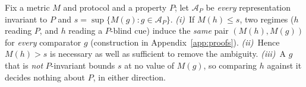 \begin{theorem}
\label{thm:necessity}
Fix a metric $M$ and protocol and a property $P$; let $\mathcal{A}_P$ be \emph{every} representation invariant to $P$ and $s=\sup\{M(g):g\in\mathcal{A}_P\}$. \emph{(i)}~If $M(h)\leq s$, two regimes ($h$ reading $P$, and $h$ reading a $P$-blind cue) induce the \emph{same} pair $(M(h),M(g))$ for \emph{every} comparator $g$ (construction in Appendix~\ref{app:proofs}). \emph{(ii)}~Hence $M(h)>s$ is necessary as well as sufficient to remove the ambiguity. \emph{(iii)}~A $g$ that is \emph{not} $P$-invariant bounds $s$ at no value of $M(g)$, so comparing $h$ against it decides nothing about $P$, in either direction.
\end{theorem}

